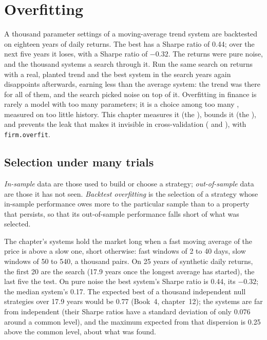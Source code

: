 \chapter{Overfitting}\label{ch:rs:overfitting}

A thousand parameter settings of a moving-average trend system are backtested on eighteen years of daily returns. The best has a Sharpe ratio
of 0.44; over the next five years it loses, with a Sharpe ratio of $-0.32$. The returns were pure noise, and the thousand systems a search through
it. Run the same search on returns with a real, planted trend and the best system in the search years again disappoints afterwards, earning less
than the average system: the trend was there for all of them, and the search picked noise on top of it. Overfitting in finance is rarely a model
with too many parameters; it is a choice among too many , measured on too little history. This chapter measures it (the ), bounds it (the ), and prevents the leak that makes it invisible in cross-validation ( and
), with \texttt{firm.overfit}.

\section{Selection under many trials}

\begin{definition}\label{def:rs:overfitting:overfitting}
\emph{In-sample} data are those used to build or choose a strategy; \emph{out-of-sample} data are those
it has not seen. \emph{Backtest overfitting} is the selection of a strategy whose in-sample performance owes more to
the particular sample than to a property that persists, so that its out-of-sample performance falls short of what was selected.
\end{definition}

The chapter's systems hold the market long when a fast moving average of the price is above a slow one, short otherwise: fast windows of 2 to 40
days, slow windows of 50 to 540, a thousand pairs. On 25 years of synthetic daily returns, the first 20 are the search (17.9 years once the longest
average has started), the last five the test. On pure noise the best system's  Sharpe ratio is 0.44, its  $-0.32$; the median
system's  0.17. The expected best of a thousand independent null strategies over 17.9 years would be 0.77 (Book~4, chapter~12); the systems
are far from independent (their Sharpe ratios have a standard deviation of only 0.076 around a common level), and the maximum expected from that
dispersion is 0.25 above the common level, about what was found.

